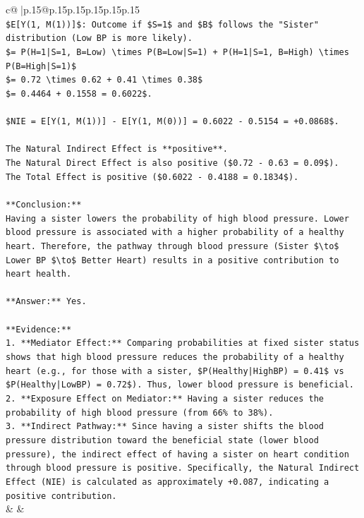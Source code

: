 \documentclass{article}
\begin{document}
{\begin{supertabular}{c@{$\;$}|p{.15\linewidth}@{}p{.15\linewidth}p{.15\linewidth}p{.15\linewidth}p{.15\linewidth}p{.15\linewidth}}
{{{\\ 
\texttt{\$E{[}Y(1, M(1)){]}\$: Outcome if \$S=1\$ and \$B\$ follows the "Sister" distribution (Low BP is more likely).} \\
\texttt{\$= P(H=1|S=1, B=Low) \textbackslash{}times P(B=Low|S=1) + P(H=1|S=1, B=High) \textbackslash{}times P(B=High|S=1)\$} \\
\texttt{\$= 0.72 \textbackslash{}times 0.62 + 0.41 \textbackslash{}times 0.38\$} \\
\texttt{\$= 0.4464 + 0.1558 = 0.6022\$.} \\
\\ 
\texttt{\$NIE = E{[}Y(1, M(1)){]} {-} E{[}Y(1, M(0)){]} = 0.6022 {-} 0.5154 = +0.0868\$.} \\
\\ 
\texttt{The Natural Indirect Effect is **positive**.} \\
\texttt{The Natural Direct Effect is also positive (\$0.72 {-} 0.63 = 0.09\$).} \\
\texttt{The Total Effect is positive (\$0.6022 {-} 0.4188 = 0.1834\$).} \\
\\ 
\texttt{**Conclusion:**} \\
\texttt{Having a sister lowers the probability of high blood pressure. Lower blood pressure is associated with a higher probability of a healthy heart. Therefore, the pathway through blood pressure (Sister \$\textbackslash{}to\$ Lower BP \$\textbackslash{}to\$ Better Heart) results in a positive contribution to heart health.} \\
\\ 
\texttt{**Answer:** Yes.} \\
\\ 
\texttt{**Evidence:**} \\
\texttt{1.  **Mediator Effect:** Comparing probabilities at fixed sister status shows that high blood pressure reduces the probability of a healthy heart (e.g., for those with a sister, \$P(Healthy|HighBP) = 0.41\$ vs \$P(Healthy|LowBP) = 0.72\$). Thus, lower blood pressure is beneficial.} \\
\texttt{2.  **Exposure Effect on Mediator:** Having a sister reduces the probability of high blood pressure (from 66\% to 38\%).} \\
\texttt{3.  **Indirect Pathway:** Since having a sister shifts the blood pressure distribution toward the beneficial state (lower blood pressure), the indirect effect of having a sister on heart condition through blood pressure is positive. Specifically, the Natural Indirect Effect (NIE) is calculated as approximately +0.087, indicating a positive contribution.} \\
            }
        }
    }
    & & \\ \\


\end{supertabular}}
\end{document}
